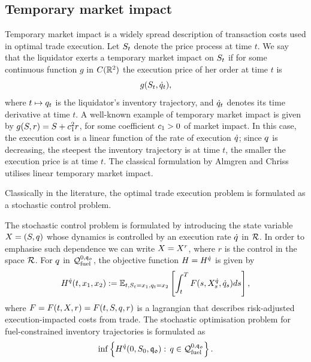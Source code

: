 \documentclass[10pt,a4paper]{article}
\begin{document}
	\subsection{Temporary market impact}\label{sec.temporaryMarketImpact}
	Temporary market impact is a widely spread description of transaction costs used in optimal trade execution. Let $S_t$ denote the price process at time $t$. We say that the liquidator exerts a temporary market impact on $S_t$ if for some continuous function $g$ in $C(\mathbb{R}^{2})$ the execution price of her order at time $t$ is 
	\begin{equation*}
	g(S_t,\dot{q}_t),
	\end{equation*} 
	where $t\mapsto q_t$ is the liquidator's inventory trajectory, and $\dot{q}_{t}$ denotes its time derivative at time $t$. A well-known example of temporary market impact is given by $g(S,r) = S+c_{1}^{2} r$, for some coefficient $c_{1}>0$ of market impact. In this case, the execution cost is a linear function of the rate of execution $\dot{q}$; since $q$ is decreasing, the steepest the inventory trajectory is at time $t$, the smaller the execution price is at time $t$. The classical formulation by Almgren and Chriss \cite{AC00opt} utilises linear temporary market impact. 
	
	Classically in the literature, the optimal trade execution problem is formulated as a stochastic control problem. 
			
	The stochastic control problem is formulated by introducing the state variable $X = (S,q)$ whose dynamics is controlled by an execution rate $\dot{q}$ in $\mathcal{R}$. In order to emphasise such dependence we can write $X=X^{r}$, where $r$ is the control in the space $\mathcal{R}$.  For $q$ in $\mathcal{Q}_{\text{fuel}}^{0,\mathfrak{q_0}}$, the objective function $H=H^{\dot{q}}$ is given by
	\begin{equation}\label{eq.objectiveFunction}
	H^{\dot{q}} (t,x_1,x_2) :=
	\mathbb{{E}}_{t,S_t=x_1, q_t=x_2}
	\left[
	\int_{t}^{T} F(s,X^{\dot{q}}_s,\dot{q}_s) ds
	\right],
	\end{equation}
	where $F=F(t,X,r)=F(t,S,q,r)$ is a lagrangian that describes risk-adjusted execution-impacted costs from trade. The stochastic optimisation problem for fuel-constrained inventory trajectories is formulated as 
	\begin{equation}\label{eq.fuelConstrainedStochOptProblem}
	\inf \left\lbrace 	H^{\dot{q}} (0,S_0,\mathfrak{q_0}): \, q \in \mathcal{Q}_{\text{fuel}}^{0,\mathfrak{q_0}} \right\rbrace . 
	\end{equation}
	
\end{document}
